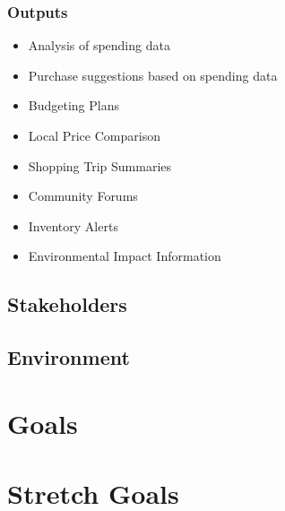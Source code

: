 \documentclass{article}
\begin{document}
\subsubsection{Outputs}
    \begin{itemize}
        \item Analysis of spending data
        \item Purchase suggestions based on spending data
        \item Budgeting Plans
        \item Local Price Comparison
        \item Shopping Trip Summaries
        \item Community Forums
        \item Inventory Alerts
        \item Environmental Impact Information
    \end{itemize}

\subsection{Stakeholders}

\subsection{Environment}


\section{Goals}

\section{Stretch Goals}
\end{document}
